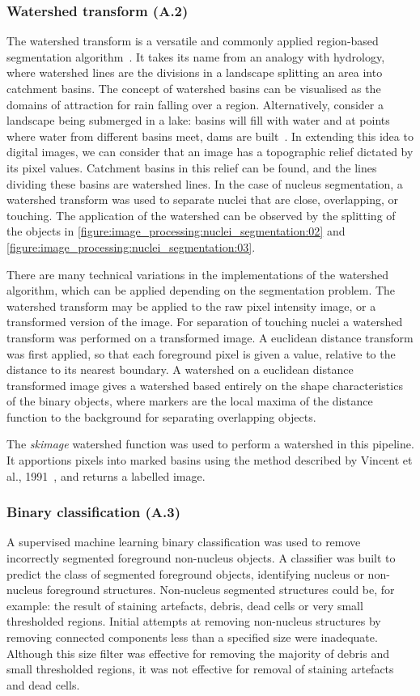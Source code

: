 \subsubsection{Watershed transform (A.2)}
The watershed transform is a versatile and commonly applied region-based segmentation algorithm~\cite{Vincent1991}. It takes its name from an analogy with hydrology, where watershed lines are the divisions in a landscape splitting an area into catchment basins. The concept of watershed basins can be visualised as the domains of attraction for rain falling over a region. Alternatively, consider a landscape being submerged in a lake: basins will fill with water and at points where water from different basins meet, dams are built~\cite{Roerdink2000}. In extending this idea to digital images, we can consider that an image has a topographic relief dictated by its pixel values. Catchment basins in this relief can be found, and the lines dividing these basins are watershed lines. In the case of nucleus segmentation, a watershed transform was used to separate nuclei that are close, overlapping, or touching. The application of the watershed can be observed by the splitting of the objects in \autoref{figure:image_processing:nuclei_segmentation:02} and \autoref{figure:image_processing:nuclei_segmentation:03}.

There are many technical variations in the implementations of the watershed algorithm, which can be applied depending on the segmentation problem. The watershed transform may be applied to the raw pixel intensity image, or a transformed version of the image. For separation of touching nuclei a watershed transform was performed on a transformed image. A euclidean distance transform was first applied, so that each foreground pixel is given a value, relative to the distance to its nearest boundary. A watershed on a euclidean distance transformed image gives a watershed based entirely on the shape characteristics of the binary objects, where markers are the local maxima of the distance function to the background for separating overlapping objects.

The \emph{skimage} watershed function was used to perform a watershed in this pipeline. It apportions pixels into marked basins using the method described by Vincent et al., 1991~\cite{Vincent1991}, and returns a labelled image.

\subsubsection{Binary classification (A.3)}
A supervised machine learning binary classification was used to remove incorrectly segmented foreground non-nucleus objects. A classifier was built to predict the class of segmented foreground objects, identifying nucleus or non-nucleus foreground structures. Non-nucleus segmented structures could be, for example: the result of staining artefacts, debris, dead cells or very small thresholded regions. Initial attempts at removing non-nucleus structures by removing connected components less than a specified size were inadequate. Although this size filter was effective for removing the majority of debris and small thresholded regions, it was not effective for removal of staining artefacts and dead cells.

